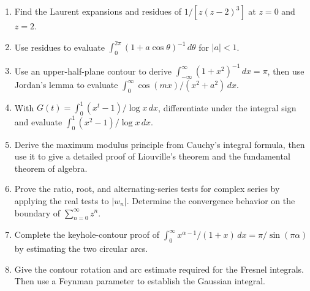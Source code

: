\begin{enumerate}
    \item Find the Laurent expansions and residues of $1/[z(z-2)^3]$ at $z=0$ and $z=2$.

    \item Use residues to evaluate $\int_0^{2\pi}(1+a\cos\theta)^{-1}\,d\theta$ for $|a|<1$.

    \item Use an upper-half-plane contour to derive $\int_{-\infty}^{\infty}(1+x^2)^{-1}\,dx=\pi$, then use Jordan's lemma to evaluate $\int_0^\infty\cos(mx)/(x^2+a^2)\,dx$.

    \item With $G(t)=\int_0^1(x^t-1)/\log x\,dx$, differentiate under the integral sign and evaluate $\int_0^1(x^2-1)/\log x\,dx$.

    \item Derive the maximum modulus principle from Cauchy's integral formula, then use it to give a detailed proof of Liouville's theorem and the fundamental theorem of algebra.

    \item Prove the ratio, root, and alternating-series tests for complex series by applying the real tests to $|w_n|$. Determine the convergence behavior on the boundary of $\sum_{n=0}^\infty z^n$.

    \item Complete the keyhole-contour proof of $\int_0^\infty x^{\alpha-1}/(1+x)\,dx=\pi/\sin(\pi\alpha)$ by estimating the two circular arcs.

    \item Give the contour rotation and arc estimate required for the Fresnel integrals. Then use a Feynman parameter to establish the Gaussian integral.
\end{enumerate}